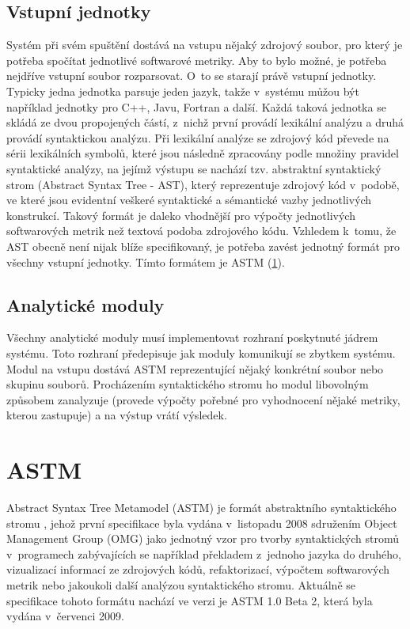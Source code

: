 \documentclass[11pt,twoside,a4paper]{book}
\begin{document}
\subsection{Vstupní jednotky}
Systém při svém spuštění dostává na vstupu nějaký zdrojový soubor, pro který je potřeba spočítat jednotlivé softwarové metriky.
Aby to bylo možné, je potřeba nejdříve vstupní soubor rozparsovat. O~to se starají právě vstupní jednotky. Typicky jedna jednotka
parsuje jeden jazyk, takže v~systému můžou být například jednotky pro C++, Javu, Fortran a další. Každá taková jednotka se
skládá ze dvou propojených částí, z~nichž první provádí lexikální analýzu a druhá provádí syntaktickou analýzu.
Při lexikální analýze se zdrojový kód převede na sérii lexikálních symbolů, které jsou následně zpracovány podle množiny
pravidel syntaktické analýzy, na jejímž výstupu se nachází tzv. abstraktní syntaktický strom (Abstract Syntax Tree - AST),
který reprezentuje zdrojový kód v~podobě, ve které jsou evidentní veškeré syntaktické a sémantické vazby jednotlivých konstrukcí.
Takový formát je daleko vhodnější pro výpočty jednotlivých softwarových metrik než textová podoba zdrojového kódu.
Vzhledem k~tomu, že AST obecně není nijak blíže specifikovaný, je potřeba zavést jednotný formát pro všechny vstupní jednotky.
Tímto formátem je ASTM (\ref{sec:ASTM}).

\subsection{Analytické moduly}
Všechny analytické moduly musí implementovat rozhraní poskytnuté jádrem systému. Toto rozhraní předepisuje jak moduly komunikují
se zbytkem systému. Modul na vstupu dostává ASTM reprezentující nějaký konkrétní soubor nebo skupinu souborů.
Procházením syntaktického stromu ho modul libovolným způsobem zanalyzuje (provede výpočty pořebné pro vyhodnocení
nějaké metriky, kterou zastupuje) a na výstup vrátí výsledek.

\section{ASTM}
\label{sec:ASTM}
Abstract Syntax Tree Metamodel (ASTM) je formát abstraktního syntaktického stromu \cite{ASTM}, jehož první specifikace byla vydána v~listopadu 2008 sdružením
Object Management Group (OMG) jako jednotný vzor pro tvorby syntaktických stromů v~programech zabývajících se například překladem
z~jednoho jazyka do druhého, vizualizací informací ze zdrojových kódů, refaktorizací, výpočtem softwarových metrik nebo jakoukoli
další analýzou syntaktického stromu. Aktuálně se specifikace tohoto formátu nachází ve verzi je ASTM 1.0 Beta 2, která byla vydána v~červenci 2009.
\end{document}
